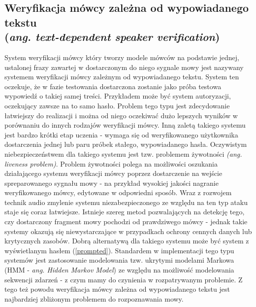 \subsection{Weryfikacja mówcy zależna od wypowiadanego tekstu \\ (\textit{ang. text-dependent speaker verification})}
\label{liveness}

System weryfikacji mówcy który tworzy modele mówców na podstawie jednej, ustalonej frazy zawartej w dostarczonym do niego sygnale mowy jest nazywany systemem weryfikacji mówcy zależnym od wypowiadanego tekstu. System ten oczekuje, że w fazie testowania dostarczona zostanie jako próba testowa wypowiedź o takiej samej treści. Przykładem może być system autoryzacji, oczekujący zawsze na to samo hasło. Problem tego typu jest zdecydowanie łatwiejszy do realizacji i można od niego oczekiwać dużo lepszych wyników w porównaniu do innych rodzajów weryfikacji mówcy. Inną zaletą takiego systemu jest bardzo krótki etap uczenia - wymaga się od weryfikowanego użytkownika dostarczenia jednej lub paru próbek stałego, wypowiadanego hasła. Oczywistym niebezpieczeństwem dla takiego systemu jest tzw. problemem żywotności \textit{(ang. liveness problem)}. Problem żywotności polega na możliwości oszukania działającego systemu weryfikacji mówcy poprzez dostarczenie na wejście spreparowanego sygnału mowy - na przykład wysokiej jakości nagranie weryfikowanego mówcy, edytowane w odpowiedni sposób. Wraz z rozwojem technik audio zmylenie systemu niezabezpieczonego ze względu na ten typ ataku staje się coraz łatwiejsze. Istnieje szereg metod pozwalających na detekcję tego, czy dostarczony fragment mowy pochodzi od prawdziwego mówcy - jednak takie systemy okazują się niewystarczające w przypadkach ochrony cennych danych lub krytycznych zasobów. Dobrą alternatywą dla takiego systemu może być system z wyświetlanym hasłem (\ref{prompted}). Standardem w implementacji tego typu systemów jest zastosowanie modelowania tzw. ukrytymi modelami Markowa (HMM - \textit{ang. Hidden Markov Model}) ze względu na możliwość modelowania sekwencji zdarzeń - z czym mamy do czynienia w rozpatrywanym problemie. Z tego też powodu weryfikacja mówcy zależna od wypowiadanego tekstu jest najbardziej zbliżonym problemem do rozpoznawania mowy.

